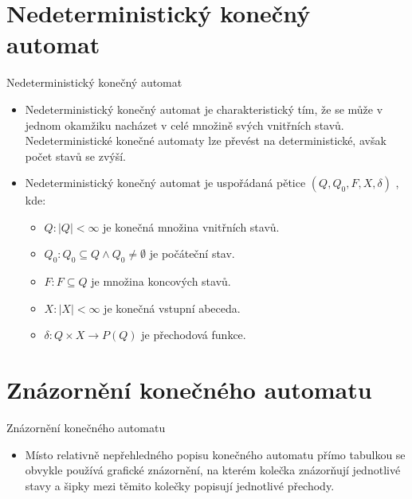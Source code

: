 \documentclass[10pt, hyperref={unicode}]{beamer}
\begin{document}
\section{Nedeterministický konečný automat}
\begin{frame}{Nedeterministický konečný automat}
\begin{itemize}
    \item Nedeterministický konečný automat je charakteristický tím, že se může v jednom okamžiku nacházet v celé množině svých vnitřních stavů. Nedeterministické konečné automaty lze převést na deterministické, avšak počet stavů se zvýší.
    \item Nedeterministický konečný automat je uspořádaná pětice $(Q,Q_0,F,X,\delta)$ , kde:
        \begin{itemize}
            \item $Q:|Q| < \infty$ je konečná množina vnitřních stavů.
            \item $Q_0:Q_0 \subseteq Q \wedge Q_0 \neq \emptyset$ je počáteční stav.
            \item $F:F \subseteq Q$ je množina koncových stavů.
            \item $X:|X| < \infty$ je konečná vstupní abeceda.
            \item $\delta:Q \times X \rightarrow P(Q)$ je přechodová funkce.
        \end{itemize}
\end{itemize}
\end{frame}

\section{Znázornění konečného automatu}
\begin{frame}{Znázornění konečného automatu}
\begin{itemize}
    \item Místo relativně nepřehledného popisu konečného automatu přímo tabulkou se obvykle používá grafické znázornění, na kterém kolečka znázorňují jednotlivé stavy a šipky mezi těmito kolečky popisují jednotlivé přechody.
\end{itemize}
\end{frame}
\end{document}
